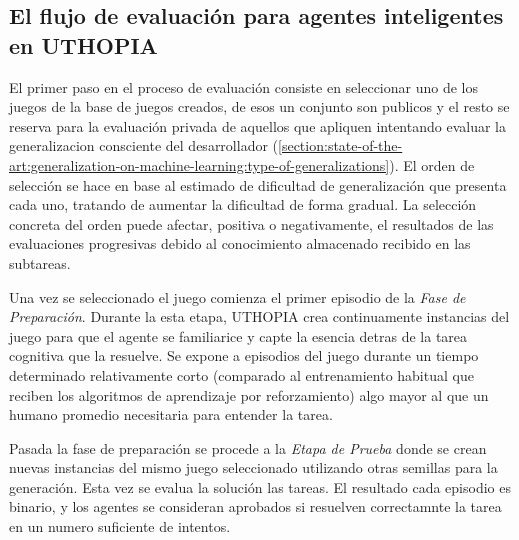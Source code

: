 \subsection{El flujo de evaluación para agentes inteligentes en UTHOPIA}

El primer paso en el proceso de evaluación consiste en seleccionar uno de los juegos de la base de juegos creados, de esos un conjunto son publicos y el resto se reserva para la evaluación privada de aquellos que apliquen intentando evaluar la generalizacion consciente del desarrollador (\ref{section:state-of-the-art:generalization-on-machine-learning:type-of-generalizations}). El orden de selección se hace en base al estimado de dificultad de generalización que presenta cada uno, tratando de aumentar la dificultad de forma gradual. La selección concreta del orden puede afectar, positiva o negativamente, el resultados de las evaluaciones progresivas debido al conocimiento almacenado recibido en las subtareas.

Una vez se seleccionado el juego comienza el primer episodio de la \textit{Fase de Preparación}. Durante la esta etapa, UTHOPIA crea continuamente instancias del juego para que el agente se familiarice y capte la esencia detras de la tarea cognitiva que la resuelve. Se expone a episodios del juego durante un tiempo determinado relativamente corto (comparado al entrenamiento habitual que reciben los algoritmos de aprendizaje por reforzamiento) algo mayor al que un humano promedio necesitaria para entender la tarea.

Pasada la fase de preparación se procede a la \textit{Etapa de Prueba} donde se crean nuevas instancias del mismo juego seleccionado utilizando otras semillas para la generación. Esta vez se evalua la solución las tareas. El resultado cada episodio es binario, y los agentes se consideran aprobados si resuelven correctamnte la tarea en un numero suficiente de intentos.